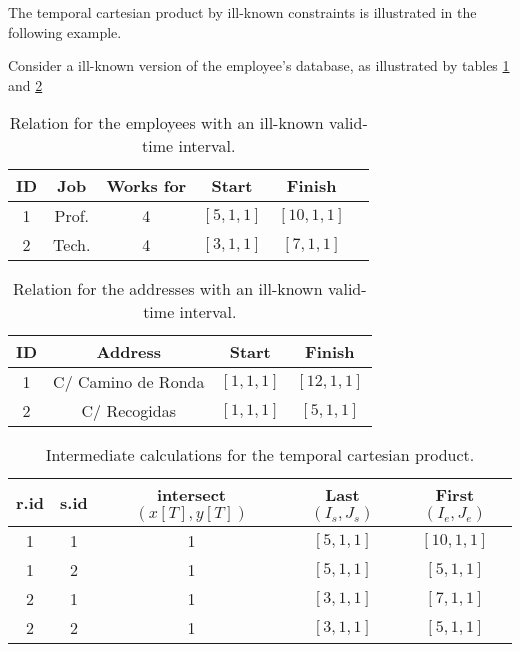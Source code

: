 The temporal cartesian product by ill-known constraints is illustrated in the following example.
\begin{example}
 \label{ex:temporal-ill-known-constraint-ik}
Consider a ill-known version of the employee's database, as illustrated by tables \ref{table:ill-known-employees} and \ref{table:ill-known-addresses}
\end{example}

\begin{table}[h]
\centering
\caption{Relation for the employees with an ill-known valid-time interval.}
\vspace{2mm}
\begin{tabular}{c c c c c c }
\hline
ID & Job & Works for & Start & Finish \\ \hline
1 & Prof. & 4 & $\left[5, 1, 1 \right]$ & $\left[10, 1, 1 \right]$ \\
2 & Tech. & 4 & $\left[3, 1, 1 \right]$ & $\left[7, 1, 1 \right]$ \\
\hline 
\end{tabular}
\label{table:ill-known-employees}
\end{table}

\begin{table}[h]
\centering
\caption{Relation for the addresses with an ill-known valid-time interval.}
\vspace{2mm}
\begin{tabular}{c c c c }
\hline
ID & Address & Start & Finish \\ \hline
1 & C/ Camino de Ronda & $\left[1, 1, 1 \right]$ & $\left[12, 1, 1 \right]$ \\
2 & C/ Recogidas &  $\left[1, 1, 1 \right]$ & $\left[5, 1, 1 \right]$ \\
\hline 
\end{tabular}
\label{table:ill-known-addresses}
\end{table}


\begin{table}[h]
\centering
\caption{Intermediate calculations for the temporal cartesian product.}
\vspace{2mm}
\begin{tabular}{c c c c c }
\hline
r.id & s.id &  intersect$\left(x\left[T\right], y\left[T\right]\right)$ &  Last$\left( I_s, J_s \right)$ & First$\left(I_e, J_e \right)$  \\ \hline
1 & 1 & 1 & $\left[5, 1, 1 \right]$ & $\left[10, 1, 1 \right]$ \\
1 & 2 & 1 & $\left[5, 1, 1 \right]$ & $\left[5, 1, 1 \right]$ \\
2 & 1 & 1 & $\left[3, 1, 1 \right]$ & $\left[7, 1, 1 \right]$ \\
2 & 2 & 1 & $\left[3, 1, 1 \right]$ & $\left[5, 1, 1 \right]$ \\
\hline 
\end{tabular}
\label{table:example-ik-cartesian-product}
\end{table}


